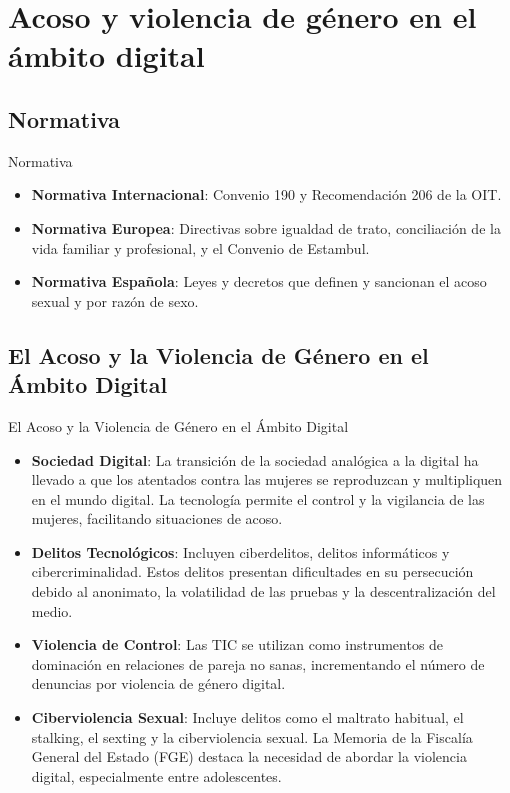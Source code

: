\documentclass{beamer}
\begin{document}
    \section{Acoso y violencia de género en el ámbito digital}

    \subsection{Normativa}
    \begin{frame}{Normativa}
        \begin{itemize}
            \item \textbf{Normativa Internacional}: Convenio 190 y Recomendación 206 de la OIT.
            \item \textbf{Normativa Europea}: Directivas sobre igualdad de trato, conciliación de la vida familiar y profesional, y el Convenio de Estambul.
            \item \textbf{Normativa Española}: Leyes y decretos que definen y sancionan el acoso sexual y por razón de sexo.
        \end{itemize}
    \end{frame}

    \subsection{El Acoso y la Violencia de Género en el Ámbito Digital}
    \begin{frame}{El Acoso y la Violencia de Género en el Ámbito Digital}
        \begin{itemize}
            \item \textbf{Sociedad Digital}: La transición de la sociedad analógica a la digital ha llevado a que los atentados contra las mujeres se reproduzcan y multipliquen en el mundo digital. La tecnología permite el control y la vigilancia de las mujeres, facilitando situaciones de acoso.
            \item \textbf{Delitos Tecnológicos}: Incluyen ciberdelitos, delitos informáticos y cibercriminalidad. Estos delitos presentan dificultades en su persecución debido al anonimato, la volatilidad de las pruebas y la descentralización del medio.
            \item \textbf{Violencia de Control}: Las TIC se utilizan como instrumentos de dominación en relaciones de pareja no sanas, incrementando el número de denuncias por violencia de género digital.
            \item \textbf{Ciberviolencia Sexual}: Incluye delitos como el maltrato habitual, el stalking, el sexting y la ciberviolencia sexual. La Memoria de la Fiscalía General del Estado (FGE) destaca la necesidad de abordar la violencia digital, especialmente entre adolescentes.
        \end{itemize}
    \end{frame}
\end{document}
